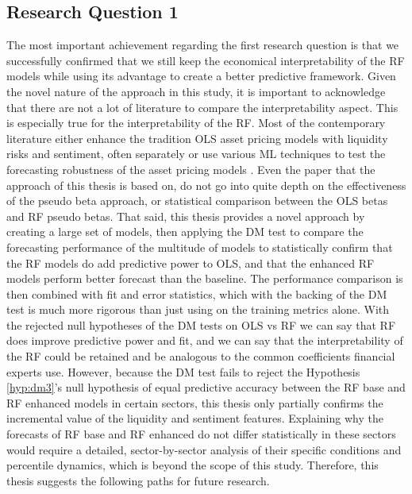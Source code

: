 
\subsection{Research Question 1}
The most important achievement regarding the first research question is that we successfully confirmed that we still keep the economical interpretability of the RF models while using its advantage to create a better predictive framework. Given the novel nature of the approach in this study, it is important to acknowledge that there are not a lot of literature to compare the interpretability aspect. This is especially true for the interpretability of the RF. Most of the contemporary literature either enhance the tradition OLS asset pricing models with liquidity risks and sentiment, often separately or use various ML techniques to test the forecasting robustness of the asset pricing models \cite{gu_2020,acharya_2005,delong_2019}. Even the paper that the approach of this thesis is based on,  do not go into quite depth on the effectiveness of the pseudo beta approach, or statistical comparison between the OLS betas and RF pseudo betas. That said, this thesis provides a novel approach by creating a large set of models, then applying the DM test to compare the forecasting performance of the multitude of models to statistically confirm that the RF models do add predictive power to OLS, and that the enhanced RF models perform better forecast than the baseline. The performance comparison is then combined with fit and error statistics, which with the backing of the DM test is much more rigorous than just using on the training metrics alone. With the rejected null hypotheses of the DM tests on OLS vs RF we can say that RF does improve predictive power and fit, and we can say that the interpretability of the RF could be retained and be analogous to the common coefficients financial experts use. However, because the DM test fails to reject the Hypothesis \ref{hyp:dm3}'s null hypothesis of equal predictive accuracy between the RF base and RF enhanced models in certain sectors, this thesis only partially confirms the incremental value of the liquidity and sentiment features. Explaining why the forecasts of RF base and RF enhanced do not differ statistically in these sectors would require a detailed, sector-by-sector analysis of their specific conditions and percentile dynamics, which is beyond the scope of this study. Therefore, this thesis suggests the following paths for future research. 

